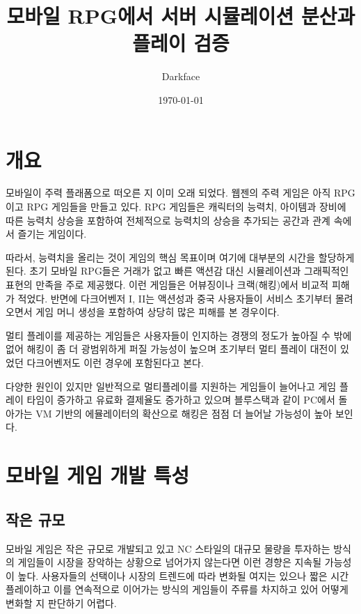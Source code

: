 \documentclass[ %
    a4paper,    %
    amsmath,    %
    itemph,     %
]{oblivoir}     %
\theoremstyle{definition}
\theoremstyle{remark}
\theoremstyle{plain}
\begin{document}
\pagestyle{headings}

\title{모바일 RPG에서 서버 시뮬레이션 분산과 플레이 검증}
\author{Darkface}
\date{\today}
\maketitle

\begin{abstract}
\end{abstract}

\tableofcontents

\section{개요}

모바일이 주력 플래폼으로 떠오른 지 이미 오래 되었다. 웹젠의 주력 게임은 아직 RPG이고
RPG 게임들을 만들고 있다. RPG 게임들은 캐릭터의 능력치, 아이템과 장비에 따른 능력치 상승을 포함하여
전체적으로 능력치의 상승을 추가되는 공간과 관계 속에서 즐기는 게임이다.

따라서, 능력치을 올리는 것이 게임의 핵심 목표이며 여기에 대부분의 시간을 할당하게 된다.
초기 모바일 RPG들은 거래가 없고 빠른 액션감 대신 시뮬레이션과 그래픽적인 표현의 만족을 주로 제공했다.
이런 게임들은 어뷰징이나 크랙(해킹)에서 비교적 피해가 적었다. 반면에 다크어벤저 I, II는 액션성과
중국 사용자들이 서비스 초기부터 몰려오면서 게임 머니 생성을 포함하여 상당히 많은 피해를 본 경우이다.

멀티 플레이를 제공하는 게임들은 사용자들이 인지하는 경쟁의 정도가 높아질 수 밖에 없어
해킹이 좀 더 광범위하게 퍼질 가능성이 높으며 초기부터 멀티 플레이 대전이 있었던 다크어벤저도
이런 경우에 포함된다고 본다.

다양한 원인이 있지만 일반적으로 멀티플레이를 지원하는 게임들이 늘어나고 게임 플레이 타임이 증가하고
유료화 결제율도 증가하고 있으며 블루스택과 같이 PC에서 돌아가는 VM 기반의 에뮬레이터의 확산으로
해킹은 점점 더 늘어날 가능성이 높아 보인다.

\section{모바일 게임 개발 특성}

\subsection{작은 규모}
모바일 게임은 작은 규모로 개발되고 있고 NC 스타일의 대규모 물량을 투자하는 방식의 게임들이
시장을 장악하는 상황으로 넘어가지 않는다면 이런 경향은 지속될 가능성이 높다. 사용자들의 선택이나
시장의 트렌드에 따라 변화될 여지는 있으나 짧은 시간 플레이하고 이를 연속적으로 이어가는 방식의 게임들이
주류를 차지하고 있어 어떻게 변화할 지 판단하기 어렵다.
\end{document}
